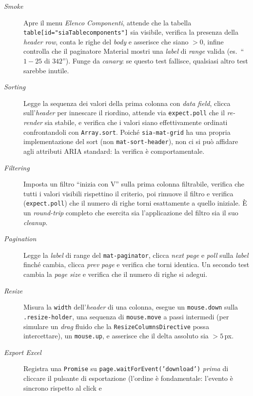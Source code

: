 \begin{description}
  \item[\emph{Smoke}] Apre il menu \emph{Elenco Componenti}, attende che la tabella
    \texttt{table[id="siaTablecomponents"]} sia visibile, verifica la presenza
    della \emph{header row}, conta le righe del \emph{body} e asserisce che siano
    $> 0$, infine controlla che il paginatore Material mostri una \emph{label} di
    \emph{range} valida (es.\ ``$1 - 25$ di $342$''). Funge da \emph{canary}: se
    questo test fallisce, qualsiasi altro test sarebbe inutile.
  \item[\emph{Sorting}] Legge la sequenza dei valori della prima colonna con
    \emph{data field}, clicca sull'\emph{header} per innescare il riordino, attende
    via \texttt{expect.poll} che il \emph{re-render} sia stabile, e verifica che i
    valori siano effettivamente ordinati confrontandoli con \texttt{Array.sort}.
    Poiché \texttt{sia-mat-grid} ha una propria implementazione del sort (non
    \texttt{mat-sort-header}), non ci si può affidare agli attributi ARIA standard:
    la verifica è comportamentale.
  \item[\emph{Filtering}] Imposta un filtro ``inizia con V'' sulla prima colonna
    filtrabile, verifica che tutti i valori visibili rispettino il criterio, poi
    rimuove il filtro e verifica (\texttt{expect.poll}) che il numero di righe torni
    esattamente a quello iniziale. È un \emph{round-trip} completo che esercita sia
    l'applicazione del filtro sia il suo \emph{cleanup}.
  \item[\emph{Pagination}] Legge la \emph{label} di range del \texttt{mat-paginator},
    clicca \emph{next page} e \emph{poll} sulla \emph{label} finché cambia, clicca
    \emph{prev page} e verifica che torni identica. Un secondo test cambia la
    \emph{page size} e verifica che il numero di righe si adegui.
  \item[\emph{Resize}] Misura la \texttt{width} dell'\emph{header} di una colonna,
    esegue un \texttt{mouse.down} sulla \texttt{.resize-holder}, una sequenza di
    \texttt{mouse.move} a passi intermedi (per simulare un \emph{drag} fluido che
    la \texttt{ResizeColumnsDirective} possa intercettare), un \texttt{mouse.up}, e
    asserisce che il delta assoluto sia $> 5$\,px.
  \item[\emph{Export Excel}] Registra una \texttt{Promise} su
    \texttt{page.waitForEvent('download')} \emph{prima} di cliccare il pulsante di
    esportazione (l'ordine è fondamentale: l'evento è sincrono rispetto al click e

\end{description}
